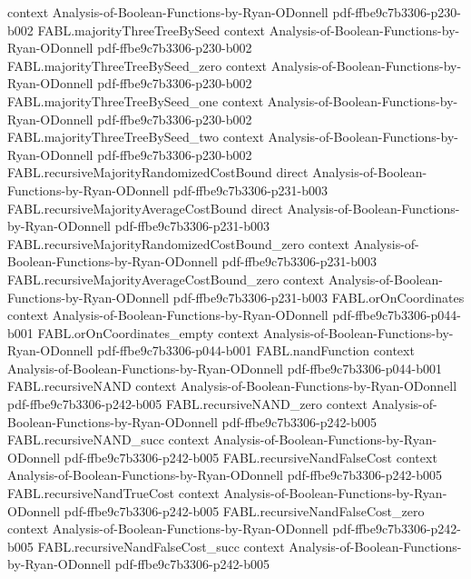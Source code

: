 \begin{theorem}
  {context}
  {Analysis-of-Boolean-Functions-by-Ryan-ODonnell}
  {pdf-ffbe9c7b3306-p230-b002}
\proofstep
  {FABL.majorityThreeTreeBySeed}
  {context}
  {Analysis-of-Boolean-Functions-by-Ryan-ODonnell}
  {pdf-ffbe9c7b3306-p230-b002}
\proofstep
  {FABL.majorityThreeTreeBySeed_zero}
  {context}
  {Analysis-of-Boolean-Functions-by-Ryan-ODonnell}
  {pdf-ffbe9c7b3306-p230-b002}
\proofstep
  {FABL.majorityThreeTreeBySeed_one}
  {context}
  {Analysis-of-Boolean-Functions-by-Ryan-ODonnell}
  {pdf-ffbe9c7b3306-p230-b002}
\proofstep
  {FABL.majorityThreeTreeBySeed_two}
  {context}
  {Analysis-of-Boolean-Functions-by-Ryan-ODonnell}
  {pdf-ffbe9c7b3306-p230-b002}
\proofstep
  {FABL.recursiveMajorityRandomizedCostBound}
  {direct}
  {Analysis-of-Boolean-Functions-by-Ryan-ODonnell}
  {pdf-ffbe9c7b3306-p231-b003}
\proofstep
  {FABL.recursiveMajorityAverageCostBound}
  {direct}
  {Analysis-of-Boolean-Functions-by-Ryan-ODonnell}
  {pdf-ffbe9c7b3306-p231-b003}
\proofstep
  {FABL.recursiveMajorityRandomizedCostBound_zero}
  {context}
  {Analysis-of-Boolean-Functions-by-Ryan-ODonnell}
  {pdf-ffbe9c7b3306-p231-b003}
\proofstep
  {FABL.recursiveMajorityAverageCostBound_zero}
  {context}
  {Analysis-of-Boolean-Functions-by-Ryan-ODonnell}
  {pdf-ffbe9c7b3306-p231-b003}
\proofstep
  {FABL.orOnCoordinates}
  {context}
  {Analysis-of-Boolean-Functions-by-Ryan-ODonnell}
  {pdf-ffbe9c7b3306-p044-b001}
\proofstep
  {FABL.orOnCoordinates_empty}
  {context}
  {Analysis-of-Boolean-Functions-by-Ryan-ODonnell}
  {pdf-ffbe9c7b3306-p044-b001}
\proofstep
  {FABL.nandFunction}
  {context}
  {Analysis-of-Boolean-Functions-by-Ryan-ODonnell}
  {pdf-ffbe9c7b3306-p044-b001}
\proofstep
  {FABL.recursiveNAND}
  {context}
  {Analysis-of-Boolean-Functions-by-Ryan-ODonnell}
  {pdf-ffbe9c7b3306-p242-b005}
\proofstep
  {FABL.recursiveNAND_zero}
  {context}
  {Analysis-of-Boolean-Functions-by-Ryan-ODonnell}
  {pdf-ffbe9c7b3306-p242-b005}
\proofstep
  {FABL.recursiveNAND_succ}
  {context}
  {Analysis-of-Boolean-Functions-by-Ryan-ODonnell}
  {pdf-ffbe9c7b3306-p242-b005}
\proofstep
  {FABL.recursiveNandFalseCost}
  {context}
  {Analysis-of-Boolean-Functions-by-Ryan-ODonnell}
  {pdf-ffbe9c7b3306-p242-b005}
\proofstep
  {FABL.recursiveNandTrueCost}
  {context}
  {Analysis-of-Boolean-Functions-by-Ryan-ODonnell}
  {pdf-ffbe9c7b3306-p242-b005}
\proofstep
  {FABL.recursiveNandFalseCost_zero}
  {context}
  {Analysis-of-Boolean-Functions-by-Ryan-ODonnell}
  {pdf-ffbe9c7b3306-p242-b005}
\proofstep
  {FABL.recursiveNandFalseCost_succ}
  {context}
  {Analysis-of-Boolean-Functions-by-Ryan-ODonnell}
  {pdf-ffbe9c7b3306-p242-b005}

\end{theorem}
